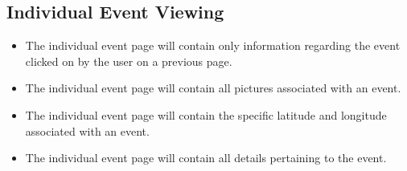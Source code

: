 \subsection{Individual Event Viewing}
\begin{itemize}
\item The individual event page will contain only information regarding the event clicked on by the user on a previous page.
\item The individual event page will contain all pictures associated with an event.
\item The individual event page will contain the specific latitude and longitude associated with an event.
\item The individual event page will contain all details pertaining to the event.
\end{itemize}


